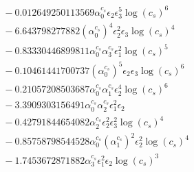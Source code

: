 \documentclass[10pt]{article}
\begin{document}
\begin{align*}
&{}  - 0.012649250113569 \alpha_{0}^{c_s} \epsilon_{2} \epsilon_{3}^{5} \log{\left(c_{s} \right)}^{6} \\
&{}  - 6.643798277882 \left(\alpha_{0}^{c_s}\right)^{4} \epsilon_{2}^{2} \epsilon_{3} \log{\left(c_{s} \right)}^{4} \\
&{}  - 0.83330446899811 \alpha_{0}^{c_s} \alpha_{3}^{c_s} \epsilon_{1}^{2} \log{\left(c_{s} \right)}^{5} \\
&{}  - 0.10461441700737 \left(\alpha_{0}^{c_s}\right)^{5} \epsilon_{2} \epsilon_{3} \log{\left(c_{s} \right)}^{6} \\
&{}  - 0.21057208503687 \alpha_{0}^{c_s} \alpha_{1}^{c_s} \epsilon_{2}^{4} \log{\left(c_{s} \right)}^{6} \\
&{}  - 3.3909303156491 \alpha_{0}^{c_s} \alpha_{2}^{c_s} \epsilon_{1}^{2} \epsilon_{2} \\
&{}  - 0.42791844654082 \alpha_{2}^{c_s} \epsilon_{2}^{2} \epsilon_{3}^{2} \log{\left(c_{s} \right)}^{4} \\
&{}  - 0.85758798544528 \alpha_{0}^{c_s} \left(\alpha_{1}^{c_s}\right)^{2} \epsilon_{2}^{2} \log{\left(c_{s} \right)}^{4} \\
&{}  - 1.7453672871882 \alpha_{3}^{c_s} \epsilon_{1}^{2} \epsilon_{2} \log{\left(c_{s} \right)}^{3}
\end{align*}
\end{document}
